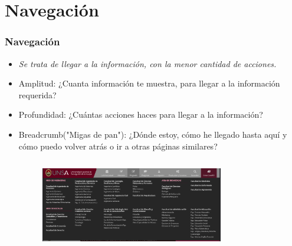 \documentclass[11pt]{beamer}
\begin{document}
    
    \section{Navegación}
    \begin{frame}
    \frametitle{Navegación}
    \begin{itemize}
    \item \emph{Se trata de llegar a la información, con la menor cantidad de acciones.}
    \item Amplitud: ¿Cuanta información te muestra, para llegar a la información requerida?
    \item Profundidad: ¿Cuántas acciones haces para llegar a la información?
    \item Breadcrumb("Migas de pan"): ¿Dónde estoy, cómo he llegado hasta aquí y cómo puedo volver atrás o ir a otras páginas similares? 
    
    \begin{figure}[t]
    \includegraphics[width=8cm, height=4cm]{unsa_breadcrumbs.PNG}
    \centering
    \end{figure}
    \end{itemize}
    \end{frame}
    
\end{document}
